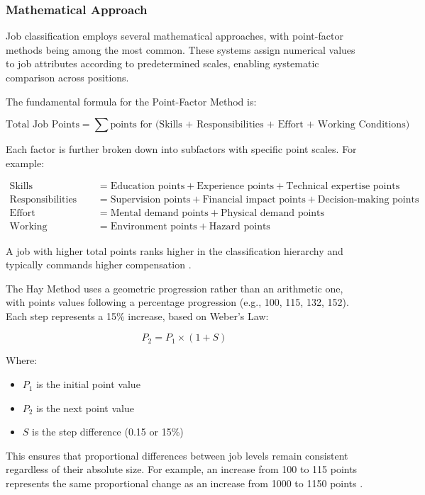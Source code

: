 \documentclass[../main.tex]{subfiles}
\begin{document}
\subsubsection{Mathematical Approach}

Job classification employs several mathematical approaches, with point-factor methods being among the most common. These systems assign numerical values to job attributes according to predetermined scales, enabling systematic comparison across positions.

The fundamental formula for the Point-Factor Method is:

\[
\text{Total Job Points} = \sum \text{points for (Skills + Responsibilities + Effort + Working Conditions)}
\]

Each factor is further broken down into subfactors with specific point scales. For example:

\begin{align}
\text{Skills} &= \text{Education points} + \text{Experience points} + \text{Technical expertise points} \\
\text{Responsibilities} &= \text{Supervision points} + \text{Financial impact points} + \text{Decision-making points} \\
\text{Effort} &= \text{Mental demand points} + \text{Physical demand points} \\
\text{Working Conditions} &= \text{Environment points} + \text{Hazard points}
\end{align}

A job with higher total points ranks higher in the classification hierarchy and typically commands higher compensation \parencite{synergogy2024}.

The Hay Method uses a geometric progression rather than an arithmetic one, with points values following a percentage progression (e.g., 100, 115, 132, 152). Each step represents a 15\% increase, based on Weber's Law:

\[
P_2 = P_1 \times (1 + S)
\]

Where:
\begin{itemize}
\item $P_1$ is the initial point value
\item $P_2$ is the next point value
\item $S$ is the step difference (0.15 or 15\%)
\end{itemize}

This ensures that proportional differences between job levels remain consistent regardless of their absolute size. For example, an increase from 100 to 115 points represents the same proportional change as an increase from 1000 to 1150 points \parencite{haygroup2024}.
\end{document}
